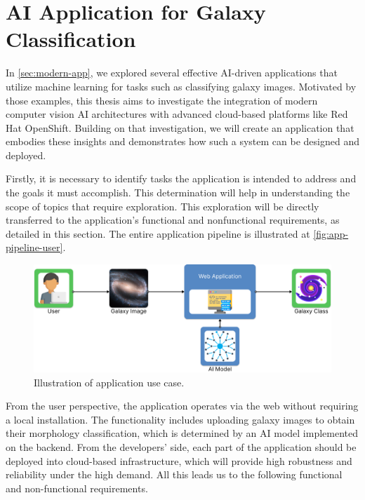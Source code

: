 \section{AI Application for Galaxy Classification}
\label{sec:ai-app}

In \autoref{sec:modern-app}, we explored several effective AI-driven applications that utilize machine learning for tasks such as classifying galaxy images. Motivated by those examples, this thesis aims to investigate the integration of modern computer vision AI architectures with advanced cloud-based platforms like Red Hat OpenShift. Building on that investigation, we will create an application that embodies these insights and demonstrates how such a system can be designed and deployed.

\medskip

Firstly, it is necessary to identify tasks the application is intended to address and the goals it must accomplish. This determination will help in understanding the scope of topics that require exploration. This exploration will be directly transferred to the application's functional and nonfunctional requirements, as detailed in this section. The entire application pipeline is illustrated at \autoref{fig:app-pipeline-user}.

\begin{figure}[htbp]\centering
  \centering
  \includegraphics[width=0.8\linewidth]{obrazky-figures/04-draft/idea.png}
  \caption{Illustration of application use case.}
  \label{fig:app-pipeline-user}
\end{figure}

From the user perspective, the application operates via the web without requiring a local installation. The functionality includes uploading galaxy images to obtain their morphology classification, which is determined by an AI model implemented on the backend. From the developers' side, each part of the application should be deployed into cloud-based infrastructure, which will provide high robustness and reliability under the high demand. All this leads us to the following functional and non-functional requirements.

